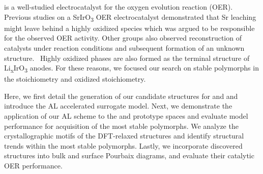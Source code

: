 is a well-studied electrocatalyst for the oxygen evolution reaction (OER).
\cite{Seitz2016,Lee2012a,McCrory2015,Trotochaud2012,Danilovic2014,Carmo2013,Miles1978,Beni1979}
%
Previous studies on a SrIrO\textsubscript{3} OER electrocatalyst demonstrated that Sr leaching might leave behind a highly oxidized  species which was argued to be responsible for the observed OER activity.
\cite{Seitz2016}
%
Other groups also observed reconstruction of \IrOx catalysts under reaction conditions and subsequent formation of an unknown structure.~\cite{Pearce2017}
%
Highly oxidized \IrOthree phases are also formed as the terminal structure of Li\textsubscript{x}IrO\textsubscript{3} anodes.\cite{Pearce2017}
%
For these reasons, we focused our search on stable polymorphs in the \IrOtwo stoichiometry and oxidized \IrOthree stoichiometry.
%


%
%
Here, we first detail the generation of our candidate structures for \IrOtwo and \IrOthree and introduce the AL accelerated surrogate model.
%
Next, we demonstrate the application of our AL scheme to the \IrOtwo and \IrOthree prototype spaces and evaluate model performance for acquisition of the most stable polymorphs.
%
We analyze the crystallographic motifs of the DFT-relaxed structures and identify structural trends within the most stable polymorphs.
%
Lastly, we incorporate discovered structures into bulk and surface Pourbaix diagrams, and evaluate their catalytic OER performance.%
%
